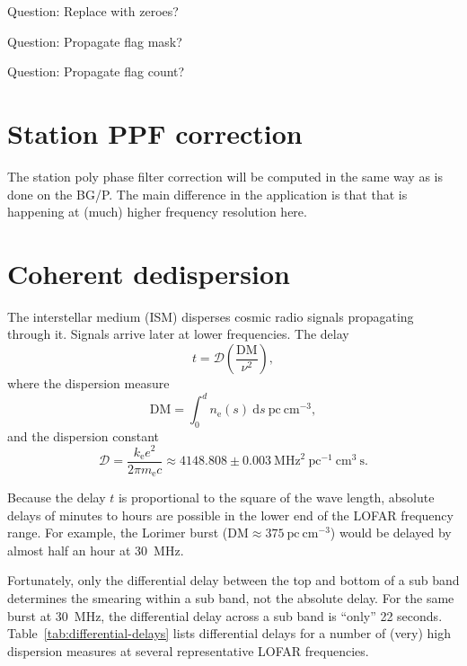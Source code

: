 \documentclass[a4paper,twoside]{article}
\newcommand{\bgp}{BG/P\xspace}
\newcommand{\dm}{\mathrm{DM}}
\begin{document}
Question: Replace with zeroes?

Question: Propagate flag mask?

Question: Propagate flag count?






%
%

\section{Station PPF correction}
\label{sec:station-PPF-correction}

The station poly phase filter correction will be computed in the same
way as is done on the \bgp. The main difference in the application is
that that is happening at (much) higher frequency resolution here.

%
%

\section{Coherent dedispersion}
\label{sec:coherent-dedispersion}

The interstellar medium (ISM) disperses cosmic radio signals propagating
through it. Signals arrive later at lower frequencies. The delay
\begin{equation}
t     =  \mathcal{D} \left(\frac{\dm}{\nu^2}\right),
\end{equation}
where the dispersion measure
\begin{equation}
\dm    =  \int_0^d n_\mathrm{e}(s)\ \mathrm{d}s\ \mathrm{pc}\ \mathrm{cm}^{-3},
\end{equation}
and the dispersion constant
\begin{equation}
\mathcal{D}  =   \frac{k_\mathrm{e}e^2}{2 \pi m_\mathrm{e} c} \approx
4148.808 \pm 0.003 \ \mathrm{MHz}^2\ \mathrm{pc}^{-1}\ \mathrm{cm}^{3}\ \mathrm{s}.
\end{equation}


Because the delay $t$ is proportional to the square of the wave
length, absolute delays of minutes to hours are possible in the lower
end of the LOFAR frequency range. For example, the Lorimer burst
($\mathrm{DM} \approx 375\ \mathrm{pc}\ \mathrm{cm}^{-3}$) would be
delayed by almost half an hour at 30~MHz.

Fortunately, only the differential delay between the top and bottom of
a sub band determines the smearing within a sub band, not the absolute
delay. For the same burst at 30~MHz, the differential delay across a
sub band is ``only'' 22 seconds. Table~\ref{tab:differential-delays}
lists differential delays for a number of (very) high dispersion
measures at several representative LOFAR frequencies.
\end{document}
